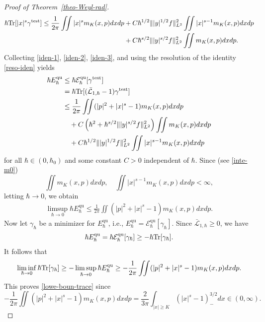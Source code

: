 \documentclass[%
11pt,  reqno]{amsart}
\theoremstyle{remarkstyle}
\newcommand{\1}{\hspace{0.2mm}\text{I}\hspace{0.2mm}}
\renewcommand{\L}{\mathcal{L}}
\DeclareMathOperator*{\qua}{qu}
\DeclareMathOperator*{\test}{test}
\numberwithin{equation}{section}
\numberwithin{theorem}{section}
\begin{document}
\begin{proof}[Proof of Theorem~\ref{theo-Weyl-rad}]
\begin{align}
			\begin{aligned}
				\hbar {\rm Tr}[|x|^s \gamma^{\test}] \leq \frac{1}{2\pi} \iint |x|^s m_K(x,p) dxdp &+ C \hbar^{1/2} \||y|^{1/2} f\|^2_{L^2} \iint |x|^{s-1} m_K(x,p)dxdp \\
				&+ C \hbar^{s/2} \||y|^{s/2} f\|^2_{L^2} \iint m_K(x,p) dxdp.
			\end{aligned}
		\end{align}
		Collecting \eqref{iden-1}, \eqref{iden-2}, \eqref{iden-3}, and using the resolution of the identity \eqref{reso-iden} yields
		\begin{align} \label{trial-boun}
			\begin{aligned}
				\hbar E^{\qua}_{\hbar} &\leq \hbar \mathcal E^{\qua}_{\hbar}[\gamma^{\test}] \\
				&= \hbar {\rm Tr}[(\bar{\L}_{1,\hbar}-1)\gamma^{\test}] \\
				&\leq \frac{1}{2\pi} \iint (|p|^2 + |x|^s -1) m_K(x,p) dxdp \\
				&\quad + C\left(\hbar^2 + \hbar^{s/2}\||y|^{s/2}f\|^2_{L^2} \right)\iint m_K(x,p)dxdp \\
				&\quad + C\hbar^{1/2} \||y|^{1/2}f\|^2_{L^2}\iint |x|^{s-1} m_K(x,p) dxdp
			\end{aligned}
		\end{align}
		for all $\hbar \in (0,\hbar_0)$ and some constant $C>0$ independent of $\hbar$. Since (see \eqref{inte-m0})
		\[
		\iint m_K(x,p)dxdp, \quad \iint |x|^{s-1} m_K(x,p) dxdp <\infty,
		\]
		letting $\hbar \to 0$, we obtain
		\begin{align} \label{uppe-boun-energy}
			\limsup_{\hbar \to 0} \hbar E^{\qua}_{\hbar} \leq \frac{1}{2\pi} \iint (|p|^2 + |x|^s -1) m_K(x,p) dxdp.
		\end{align}
		Now let $\gamma_{\hbar}$ be a minimizer for $E^{\qua}_{\hbar}$, i.e., $E^{\qua}_{\hbar} = \mathcal E^{\qua}_{\hbar}[\gamma_{\hbar}]$. Since $\bar{\L}_{1,\hbar} \geq 0$, we have
		\[
		\hbar E^{\qua}_{\hbar} = \hbar \mathcal E^{\qua}_{\hbar}[\gamma_{\hbar}] \geq -\hbar {\rm Tr}[\gamma_{\hbar}].
		\]
		It follows that
		\[
		\liminf_{\hbar \to 0} \hbar {\rm Tr}[\gamma_{\hbar}] \geq -\limsup_{\hbar \to 0} \hbar E^{\qua}_{\hbar} \geq -\frac{1}{2\pi} \iint (|p|^2 +|x|^s-1) m_K(x,p) dxdp.
		\]
		This proves \eqref{lowe-boun-trace} since
		\[	
		-\frac{1}{2\pi} \iint (|p|^2 +|x|^s-1) m_K(x,p) dxdp = \frac{2}{3\pi} \int_{|x|\geq K} (|x|^s-1)_-^{3/2} dx \in (0,\infty).
		\]
		

\end{proof}
\end{document}
